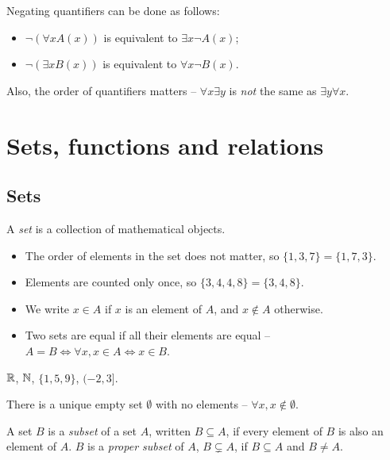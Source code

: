 \documentclass{../../template/note}
\begin{document}
    Negating quantifiers can be done as follows:
    \begin{itemize}
        \item \(\neg (\forall x A(x))\) is equivalent to \(\exists x \neg A(x)\);
        \item \(\neg (\exists x B(x))\) is equivalent to \(\forall x \neg B(x)\).
    \end{itemize}
    
    Also, the order of quantifiers matters -- \(\forall x \exists y\) is \emph{not} the same as \(\exists y \forall x\).

    \section{Sets, functions and relations}

    \subsection{Sets}

    \begin{definition}
        A \emph{set} is a collection of mathematical objects.
        \begin{itemize}
            \item The order of elements in the set does not matter, so \(\{1, 3, 7\} = \{1, 7, 3\}\).
            \item Elements are counted only once, so \(\{3, 4, 4, 8\} = \{3, 4, 8\}\).
            \item We write \(x \in A\) if \(x\) is an element of \(A\), and \(x \notin A\) otherwise.
            \item Two sets are equal if all their elements are equal -- \(A = B \iff \forall x, x \in A \iff x \in B\).
        \end{itemize}
    \end{definition}

    \begin{example*}
        \(\mathbb R\), \(\mathbb N\), \(\{1, 5, 9\}\), \((-2, 3]\).
    \end{example*}
    
    There is a unique empty set \(\emptyset\) with no elements -- \(\forall x, x \notin \emptyset\).

    \begin{definition}
        A set \(B\) is a \emph{subset} of a set \(A\), written \(B \subseteq A\), if every element of \(B\) is also an element of \(A\). \(B\) is a \emph{proper subset} of \(A\), \(B \subsetneq A\), if \(B \subseteq A\) and \(B \neq A\).
    \end{definition}
    
\end{document}
